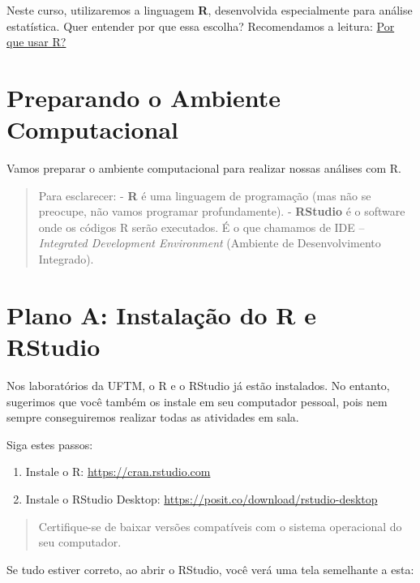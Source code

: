 \documentclass[
]{book}
\providecommand{\tightlist}{%
  \setlength{\itemsep}{0pt}\setlength{\parskip}{0pt}}
\begin{document}
Neste curso, utilizaremos a linguagem \textbf{R}, desenvolvida especialmente para análise estatística. Quer entender por que essa escolha? Recomendamos a leitura: \href{https://blog.curso-r.com/posts/2021-07-23-por-que-usar-r/}{Por que usar R?}

\section{Preparando o Ambiente Computacional}\label{preparando-o-ambiente-computacional}

Vamos preparar o ambiente computacional para realizar nossas análises com R.

\begin{quote}
Para esclarecer:
- \textbf{R} é uma linguagem de programação (mas não se preocupe, não vamos programar profundamente).
- \textbf{RStudio} é o software onde os códigos R serão executados. É o que chamamos de IDE -- \emph{Integrated Development Environment} (Ambiente de Desenvolvimento Integrado).
\end{quote}

\section{Plano A: Instalação do R e RStudio}\label{plano-a-instalauxe7uxe3o-do-r-e-rstudio}

Nos laboratórios da UFTM, o R e o RStudio já estão instalados. No entanto, sugerimos que você também os instale em seu computador pessoal, pois nem sempre conseguiremos realizar todas as atividades em sala.

Siga estes passos:

\begin{enumerate}
\def\labelenumi{\arabic{enumi}.}
\tightlist
\item
  Instale o R: \url{https://cran.rstudio.com}
\item
  Instale o RStudio Desktop: \url{https://posit.co/download/rstudio-desktop}
\end{enumerate}

\begin{quote}
Certifique-se de baixar versões compatíveis com o sistema operacional do seu computador.
\end{quote}

Se tudo estiver correto, ao abrir o RStudio, você verá uma tela semelhante a esta:
\end{document}
